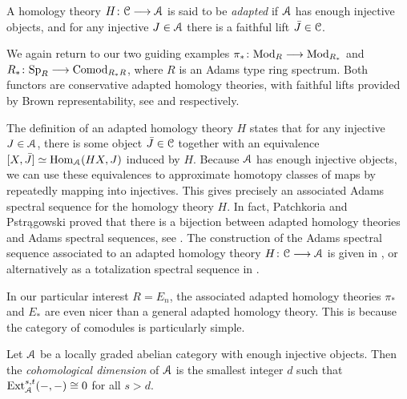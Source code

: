 \begin{definition}
    \label{ch2:def:adapted-homology-theory}
    A homology theory $H\colon \EuScript{C}\longrightarrow \EuScript{A}$ is said to be \emph{adapted} if $\EuScript{A}$ has enough injective objects, and for any injective $J \in \EuScript{A}$ there is a faithful lift $\bar{J}\in \EuScript{C}$. 
\end{definition}

\begin{example}
    We again return to our two guiding examples $\pi_*\colon \mathrm{Mod}_R\longrightarrow \mathrm{Mod}_{R_*}$ and $R_*\colon \mathrm{Sp}_R\longrightarrow \mathrm{Comod}_{R_*R}$, where $R$ is an Adams type ring spectrum. Both functors are conservative adapted homology theories, with faithful lifts provided by Brown representability, see \cite[8.2]{patchkoria-pstragowski_2021} and \cite[8.13]{patchkoria-pstragowski_2021} respectively. 
\end{example}


\begin{remark}
    The definition of an adapted homology theory $H$ states that for any injective $J\in \EuScript{A}$, there is some object $\bar{J}\in \EuScript{C}$ together with an equivalence $[X,\bar{J}]\simeq \operatorname{Hom}_{\EuScript{A}}(HX, J)$ induced by $H$. Because $\EuScript{A}$ has enough injective objects, we can use these equivalences to approximate homotopy classes of maps by repeatedly mapping into injectives. This gives precisely an associated Adams spectral sequence for the homology theory $H$. In fact, Patchkoria and Pstr{\k a}gowski proved that there is a bijection between adapted homology theories and Adams spectral sequences, see \cite[3.24, 3.25]{patchkoria-pstragowski_2021}. The construction of the Adams spectral sequence associated to an adapted homology theory $H\colon \EuScript{C}\longrightarrow \EuScript{A}$ is given in \cite[2.24]{patchkoria-pstragowski_2021}, or alternatively as a totalization spectral sequence in \cite[2.27]{patchkoria-pstragowski_2021}. 
\end{remark}

In our particular interest $R=E_n$, the associated adapted homology theories $\pi_*$ and $E_*$ are even nicer than a general adapted homology theory. This is because the category of comodules is particularly simple. 

\begin{definition}
    \label{ch2:def:cohomological-dimension}
    Let $\EuScript{A}$ be a locally graded abelian category with enough injective objects. Then the \emph{cohomological dimension} of $\EuScript{A}$ is the smallest integer $d$ such that $\operatorname{Ext}^{s,t}_{\EuScript{A}}(-,-) \cong 0$ for all $s>d$. 
\end{definition}

